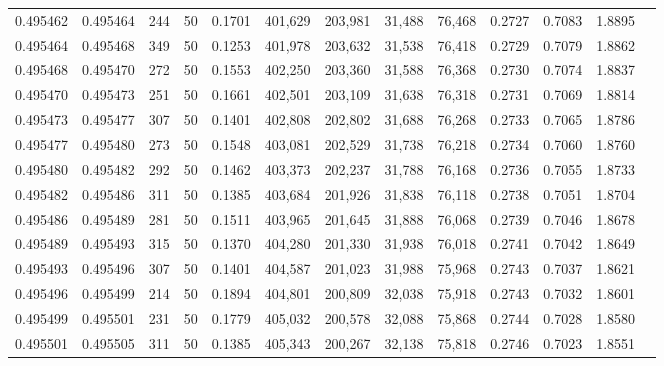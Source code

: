 \begin{tabular}{rrrrrrrrrrrrr}
0.495462 & 0.495464 &   244 &  50 &                                     0.1701 & 401,629 & 203,981 &  31,488 &  76,468 & 0.2727 & 0.7083 & 1.8895 \\
0.495464 & 0.495468 &   349 &  50 &                                     0.1253 & 401,978 & 203,632 &  31,538 &  76,418 & 0.2729 & 0.7079 & 1.8862 \\
0.495468 & 0.495470 &   272 &  50 &                                     0.1553 & 402,250 & 203,360 &  31,588 &  76,368 & 0.2730 & 0.7074 & 1.8837 \\
0.495470 & 0.495473 &   251 &  50 &                                     0.1661 & 402,501 & 203,109 &  31,638 &  76,318 & 0.2731 & 0.7069 & 1.8814 \\
0.495473 & 0.495477 &   307 &  50 &                                     0.1401 & 402,808 & 202,802 &  31,688 &  76,268 & 0.2733 & 0.7065 & 1.8786 \\
0.495477 & 0.495480 &   273 &  50 &                                     0.1548 & 403,081 & 202,529 &  31,738 &  76,218 & 0.2734 & 0.7060 & 1.8760 \\
0.495480 & 0.495482 &   292 &  50 &                                     0.1462 & 403,373 & 202,237 &  31,788 &  76,168 & 0.2736 & 0.7055 & 1.8733 \\
0.495482 & 0.495486 &   311 &  50 &                                     0.1385 & 403,684 & 201,926 &  31,838 &  76,118 & 0.2738 & 0.7051 & 1.8704 \\
0.495486 & 0.495489 &   281 &  50 &                                     0.1511 & 403,965 & 201,645 &  31,888 &  76,068 & 0.2739 & 0.7046 & 1.8678 \\
0.495489 & 0.495493 &   315 &  50 &                                     0.1370 & 404,280 & 201,330 &  31,938 &  76,018 & 0.2741 & 0.7042 & 1.8649 \\
0.495493 & 0.495496 &   307 &  50 &                                     0.1401 & 404,587 & 201,023 &  31,988 &  75,968 & 0.2743 & 0.7037 & 1.8621 \\
0.495496 & 0.495499 &   214 &  50 &                                     0.1894 & 404,801 & 200,809 &  32,038 &  75,918 & 0.2743 & 0.7032 & 1.8601 \\
0.495499 & 0.495501 &   231 &  50 &                                     0.1779 & 405,032 & 200,578 &  32,088 &  75,868 & 0.2744 & 0.7028 & 1.8580 \\
0.495501 & 0.495505 &   311 &  50 &                                     0.1385 & 405,343 & 200,267 &  32,138 &  75,818 & 0.2746 & 0.7023 & 1.8551 \\

\end{tabular}
